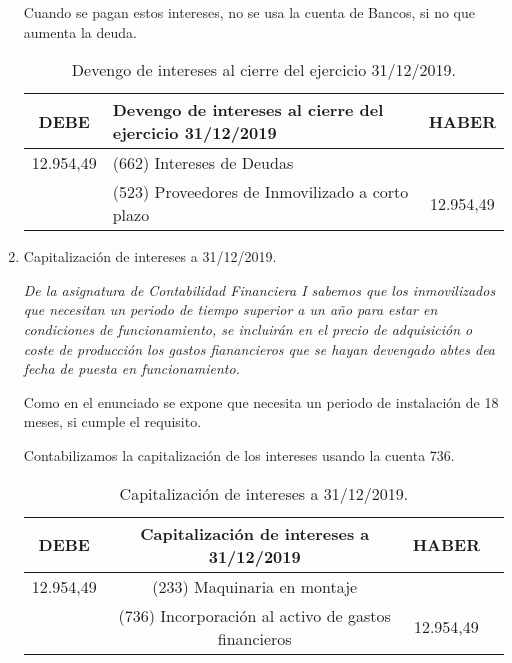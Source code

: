\begin{enumerate}[label=\alph*)]
    Cuando se pagan estos intereses, no se usa la cuenta de Bancos, si no que aumenta la deuda.

    \begin{table}[H]
        \centering
        \begin{tabular}{|c|p{6cm}|c|}
            \hline
            \rowcolor{blue!30}
            \textbf{DEBE} & \textbf{Devengo de intereses al cierre del ejercicio 31/12/2019} & \textbf{HABER} \\
            \hline
            12.954,49 & (662) Intereses de Deudas & \\
            \hline
            & (523) Proveedores de Inmovilizado a corto plazo & 12.954,49 \\
            \hline
        \end{tabular}
        \caption{Devengo de intereses al cierre del ejercicio 31/12/2019.}
        \label{tabla:devengo_intereses_2019}
    \end{table}

    \item Capitalización de intereses a 31/12/2019.

    \textit{De la asignatura de Contabilidad Financiera I sabemos que los inmovilizados que necesitan un periodo de tiempo superior a un año para estar en condiciones de funcionamiento, se incluirán en el precio de adquisición o coste de producción los gastos fianancieros que se hayan devengado abtes dea fecha de puesta en funcionamiento.}
    
    Como en el enunciado se expone que necesita un periodo de instalación de 18 meses, si cumple el requisito.

    Contabilizamos la capitalización de los intereses usando la cuenta 736.

    \begin{table}[H]
        \centering
        \begin{tabular}{|c|c|c|c|}
            \hline
            \rowcolor{blue!30}
            \textbf{DEBE} & \textbf{Capitalización de intereses a 31/12/2019} & \textbf{HABER} \\
            \hline
            12.954,49 & (233) Maquinaria en montaje & \\
            \hline
            & (736) Incorporación al activo de gastos financieros & 12.954,49 \\
            \hline
        \end{tabular}
        \caption{Capitalización de intereses a 31/12/2019.}
        \label{tabla:capitalizacion_intereses}
    \end{table}
    


\end{enumerate}
